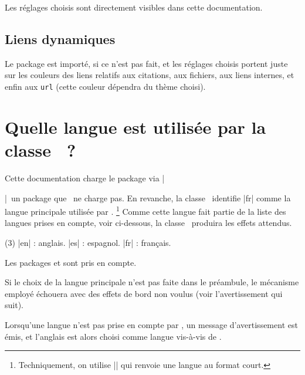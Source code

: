 Les réglages choisis sont directement visibles dans cette documentation.


\subsection{Liens dynamiques}

Le package  est importé, si ce n'est pas fait, et les réglages choisis portent juste sur les couleurs des liens relatifs aux citations, aux fichiers, aux liens internes, et enfin aux \verb#url# (cette couleur dépendra du thème choisi).


\section{Quelle langue est utilisée par la classe \thisproj\ ?}

Cette documentation charge le package  via \tdoclatexin|\usepackage[english]{babel}|\, un package que \thisproj\ ne charge pas.
En revanche, la classe \thisproj\ identifie \tdoclatexin|fr| comme la langue principale utilisée par .%
\footnote{
    Techniquement, on utilise \tdoclatexin|| qui renvoie une langue au format court.
}
Comme cette langue fait partie de la liste des langues prises en compte, voir ci-dessous, la classe \thisproj\ produira les effets attendus.

\begin{tasks}[label=\small\textbullet](3)
    \task \tdoclatexin|en| : anglais.
        \task \tdoclatexin|es| : espagnol.
        \task \tdoclatexin|fr| : français.
\end{tasks}
                    


\begin{tdocnote}
    Les packages  et  sont pris en compte.
\end{tdocnote}


\begin{tdoccaut}
    Si le choix de la langue principale n'est pas faite dans le préambule, le mécanisme employé échouera avec des effets de bord non voulus (voir l'avertissement qui suit).
\end{tdoccaut}


\begin{tdocwarn}
    Lorsqu'une langue n'est pas prise en compte par \thisproj, un message d'avertissement est émis, et l'anglais est alors choisi comme langue vis-à-vis de \thisproj.
\end{tdocwarn}


